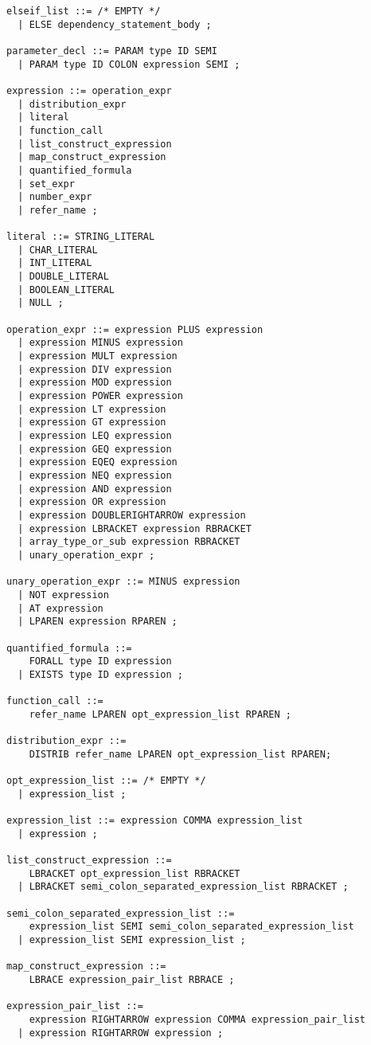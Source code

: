 \documentclass[12pt]{article}
\begin{document}
\begin{verbatim}
elseif_list ::= /* EMPTY */
  | ELSE dependency_statement_body ;

parameter_decl ::= PARAM type ID SEMI
  | PARAM type ID COLON expression SEMI ;

expression ::= operation_expr
  | distribution_expr
  | literal
  | function_call
  | list_construct_expression
  | map_construct_expression
  | quantified_formula
  | set_expr
  | number_expr
  | refer_name ;

literal ::= STRING_LITERAL
  | CHAR_LITERAL
  | INT_LITERAL
  | DOUBLE_LITERAL
  | BOOLEAN_LITERAL
  | NULL ;

operation_expr ::= expression PLUS expression
  | expression MINUS expression
  | expression MULT expression
  | expression DIV expression
  | expression MOD expression
  | expression POWER expression
  | expression LT expression
  | expression GT expression
  | expression LEQ expression
  | expression GEQ expression
  | expression EQEQ expression
  | expression NEQ expression
  | expression AND expression
  | expression OR expression
  | expression DOUBLERIGHTARROW expression
  | expression LBRACKET expression RBRACKET
  | array_type_or_sub expression RBRACKET
  | unary_operation_expr ;

unary_operation_expr ::= MINUS expression
  | NOT expression
  | AT expression
  | LPAREN expression RPAREN ;

quantified_formula ::= 
    FORALL type ID expression
  | EXISTS type ID expression ;

function_call ::= 
    refer_name LPAREN opt_expression_list RPAREN ;

distribution_expr ::= 
    DISTRIB refer_name LPAREN opt_expression_list RPAREN;

opt_expression_list ::= /* EMPTY */
  | expression_list ;

expression_list ::= expression COMMA expression_list
  | expression ;

list_construct_expression ::= 
    LBRACKET opt_expression_list RBRACKET
  | LBRACKET semi_colon_separated_expression_list RBRACKET ;

semi_colon_separated_expression_list ::=
    expression_list SEMI semi_colon_separated_expression_list
  | expression_list SEMI expression_list ;

map_construct_expression ::= 
    LBRACE expression_pair_list RBRACE ;

expression_pair_list ::=
    expression RIGHTARROW expression COMMA expression_pair_list
  | expression RIGHTARROW expression ;
  

\end{verbatim}
\end{document}
